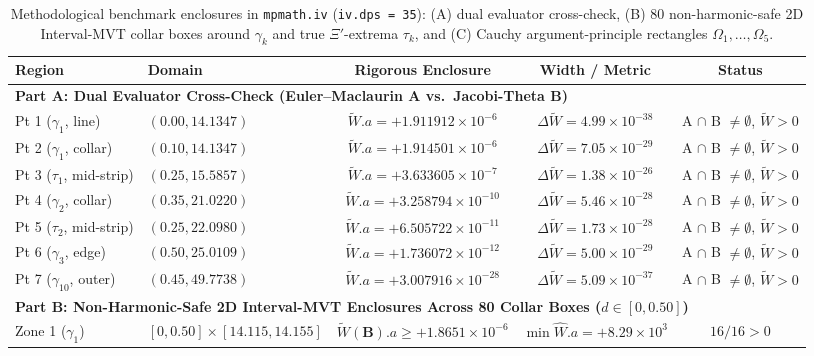 \documentclass[11pt,a4paper,reqno]{amsart}
\theoremstyle{definition}
\theoremstyle{remark}
\numberwithin{equation}{section}
\newcommand{\Wtil}{\widetilde{W}}
\newcommand{\What}{\widehat{W}}
\begin{document}
\begin{table}[htbp]
\centering
\caption{Methodological benchmark enclosures in \texttt{mpmath.iv} (\texttt{iv.dps = 35}): (A) dual evaluator cross-check, (B) 80 non-harmonic-safe 2D Interval-MVT collar boxes around $\gamma_k$ and true $\Xi'$-extrema $\tau_k$, and (C) Cauchy argument-principle rectangles $\Omega_1, \dots, \Omega_5$.}\label{tab:dual_and_mvt}
\scriptsize
\setlength{\tabcolsep}{2.4pt}
\begin{tabular}{llccc}
\toprule
\textbf{Region} & \textbf{Domain} & \textbf{Rigorous Enclosure} & \textbf{Width / Metric} & \textbf{Status} \\
\midrule
\multicolumn{5}{l}{\textbf{Part A: Dual Evaluator Cross-Check (Euler--Maclaurin A vs.\ Jacobi-Theta B)}} \\
Pt 1 ($\gamma_1$, line)      & $(0.00, 14.1347)$ & $\Wtil.a = +1.911912 \times 10^{-6}$  & $\Delta\Wtil = 4.99 \times 10^{-38}$ & A $\cap$ B $\neq \emptyset$, $\Wtil > 0$ \\
Pt 2 ($\gamma_1$, collar)    & $(0.10, 14.1347)$ & $\Wtil.a = +1.914501 \times 10^{-6}$  & $\Delta\Wtil = 7.05 \times 10^{-29}$ & A $\cap$ B $\neq \emptyset$, $\Wtil > 0$ \\
Pt 3 ($\tau_1$, mid-strip)   & $(0.25, 15.5857)$ & $\Wtil.a = +3.633605 \times 10^{-7}$  & $\Delta\Wtil = 1.38 \times 10^{-26}$ & A $\cap$ B $\neq \emptyset$, $\Wtil > 0$ \\
Pt 4 ($\gamma_2$, collar)    & $(0.35, 21.0220)$ & $\Wtil.a = +3.258794 \times 10^{-10}$ & $\Delta\Wtil = 5.46 \times 10^{-28}$ & A $\cap$ B $\neq \emptyset$, $\Wtil > 0$ \\
Pt 5 ($\tau_2$, mid-strip)   & $(0.25, 22.0980)$ & $\Wtil.a = +6.505722 \times 10^{-11}$ & $\Delta\Wtil = 1.73 \times 10^{-28}$ & A $\cap$ B $\neq \emptyset$, $\Wtil > 0$ \\
Pt 6 ($\gamma_3$, edge)      & $(0.50, 25.0109)$ & $\Wtil.a = +1.736072 \times 10^{-12}$ & $\Delta\Wtil = 5.00 \times 10^{-29}$ & A $\cap$ B $\neq \emptyset$, $\Wtil > 0$ \\
Pt 7 ($\gamma_{10}$, outer)  & $(0.45, 49.7738)$ & $\Wtil.a = +3.007916 \times 10^{-28}$ & $\Delta\Wtil = 5.09 \times 10^{-37}$ & A $\cap$ B $\neq \emptyset$, $\Wtil > 0$ \\
\midrule
\multicolumn{5}{l}{\textbf{Part B: Non-Harmonic-Safe 2D Interval-MVT Enclosures Across 80 Collar Boxes ($d \in [0, 0.50]$)}} \\
Zone 1 ($\gamma_1$) & $[0, 0.50] \times [14.115, 14.155]$ & $\Wtil(\mathbf{B}).a \ge +1.8651 \times 10^{-6}$  & $\min\What.a = +8.29 \times 10^3$ & $16/16 > 0$ \\

\end{tabular}
\end{table}
\end{document}
